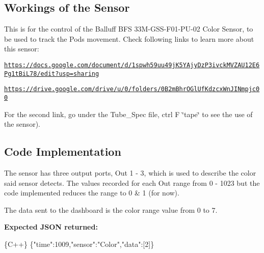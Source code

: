 \subsection*{Workings of the Sensor}

This is for the control of the Balluff B\+FS 33\+M-\/\+G\+S\+S-\/\+F01-\/\+P\+U-\/02 Color Sensor, to be used to track the Pods movement. Check following links to learn more about this sensor\+:
\begin{DoxyItemize}
\item \href{https://docs.google.com/document/d/1spwh59uu49jK5YAjyDzP3ivckMVZAU12E6Pg1tBiL78/edit?usp=sharing}{\tt https\+://docs.\+google.\+com/document/d/1spwh59uu49j\+K5\+Y\+Ajy\+Dz\+P3ivck\+M\+V\+Z\+A\+U12\+E6\+Pg1t\+Bi\+L78/edit?usp=sharing}
\item \href{https://drive.google.com/drive/u/0/folders/0B2mBhrOGlUfKdzcxWnJINmpjc00}{\tt https\+://drive.\+google.\+com/drive/u/0/folders/0\+B2m\+Bhr\+O\+Gl\+Uf\+Kdzcx\+Wn\+J\+I\+Nmpjc00}
\end{DoxyItemize}

For the second link, go under the Tube\+\_\+\+Spec file, ctrl F \char`\"{}tape\char`\"{} to see the use of the sensor).

\subsection*{Code Implementation}

The sensor has three output ports, Out 1 -\/ 3, which is used to describe the color said sensor detects. The values recorded for each Out range from 0 -\/ 1023 but the code implemented reduces the range to 0 \& 1 (for now).

The data sent to the dashboard is the color range value from 0 to 7.

{\bfseries Expected J\+S\+ON returned\+:} 
\begin{DoxyCode}
\{C++\}
\{"time":1009,"sensor":"Color","data":[2]\}
\end{DoxyCode}
 